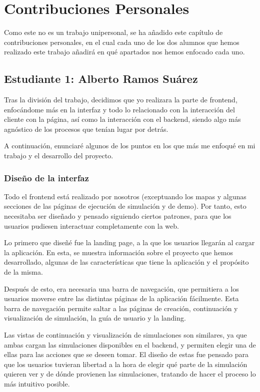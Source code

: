 \chapter*{Contribuciones Personales}
\label{cap:contribucionesPersonales}

Como este no es un trabajo unipersonal, se ha añadido este capítulo de contribuciones personales, en el cual cada uno de los dos alumnos que hemos realizado este trabajo añadirá en qué apartados nos hemos enfocado cada uno.

\section*{Estudiante 1: Alberto Ramos Suárez}

Tras la división del trabajo, decidimos que yo realizara la parte de frontend, enfocándome más en la interfaz y todo lo relacionado con la interacción del cliente con la página, así como la interacción con el backend, siendo algo más agnóstico de los procesos que tenían lugar por detrás.

A continuación, enunciaré algunos de los puntos en los que más me enfoqué en mi trabajo y el desarrollo del proyecto.

\subsection*{Diseño de la interfaz}

Todo el frontend está realizado por nosotros (exceptuando los mapas y algunas secciones de las páginas de ejecución de simulación y de demo). Por tanto, esto necesitaba ser diseñado y pensado siguiendo ciertos patrones, para que los usuarios pudiesen interactuar completamente con la web.

Lo primero que diseñé fue la landing page, a la que los usuarios llegarán al cargar la aplicación. En esta, se muestra información sobre el proyecto que hemos desarrollado, algunas de las características que tiene la aplicación y el propósito de la misma.

Después de esto, era necesaria una barra de navegación, que permitiera a los usuarios moverse entre las distintas páginas de la aplicación fácilmente. Esta barra de navegación permite saltar a las páginas de creación, continuación y visualización de simulación, la guía de usuario y la landing.

Las vistas de continuación y visualización de simulaciones son similares, ya que ambas cargan las simulaciones disponibles en el backend, y permiten elegir una de ellas para las acciones que se deseen tomar. El diseño de estas fue pensado para que los usuarios tuvieran libertad a la hora de elegir qué parte de la simulación quieren ver y de dónde provienen las simulaciones, tratando de hacer el proceso lo más intuitivo posible.

